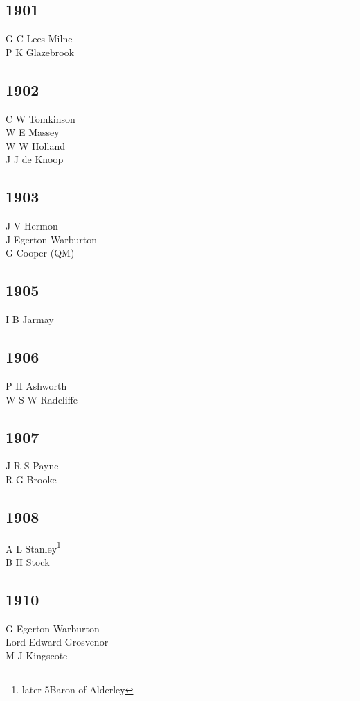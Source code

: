 \begin{multicols}{3}
  \subsection*{1901}
  G C Lees Milne \\
  P K Glazebrook \\
  \subsection*{1902}
  C W Tomkinson \\
  W E Massey \\
  W W Holland \\
  J J de Knoop \\
  \subsection*{1903}
  J V Hermon \\
  J Egerton-Warburton \\
  G Cooper (QM) \\
  \subsection*{1905}
  I B Jarmay \\
  \subsection*{1906}
  P H Ashworth \\
  W S W Radcliffe \\
  \subsection*{1907}
  J R S Payne \\
  R G Brooke \\
  \subsection*{1908}
  A L Stanley\footnote{later 5\nth Baron of Alderley} \\
  B H Stock \\
  \subsection*{1910}
  G Egerton-Warburton \\
  Lord Edward Grosvenor \\
  M J Kingscote \\

\end{multicols}
